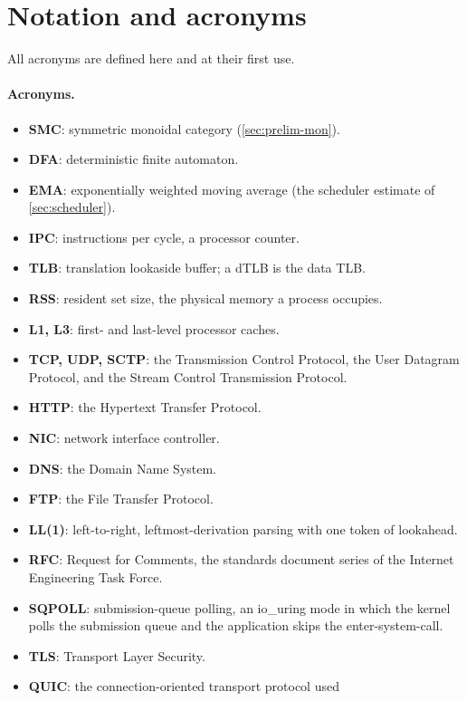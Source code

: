 \section{Notation and acronyms}\label{sec:prelim-notation}

All acronyms are defined here and at their first use.

\paragraph{Acronyms.}
\begin{itemize}
\item \textbf{SMC}: symmetric monoidal category (\autoref{sec:prelim-mon}).
\item \textbf{DFA}: deterministic finite automaton.
\item \textbf{EMA}: exponentially weighted moving average (the
  scheduler estimate of \autoref{sec:scheduler}).
\item \textbf{IPC}: instructions per cycle, a processor counter.
\item \textbf{TLB}: translation lookaside buffer; a dTLB is the data
  TLB.
\item \textbf{RSS}: resident set size, the physical memory a process
  occupies.
\item \textbf{L1, L3}: first- and last-level processor caches.
\item \textbf{TCP, UDP, SCTP}: the Transmission Control Protocol, the
  User Datagram Protocol, and the Stream Control Transmission Protocol.
\item \textbf{HTTP}: the Hypertext Transfer Protocol.
\item \textbf{NIC}: network interface controller.
\item \textbf{DNS}: the Domain Name System.
\item \textbf{FTP}: the File Transfer Protocol.
\item \textbf{LL(1)}: left-to-right, leftmost-derivation parsing with
  one token of lookahead.
\item \textbf{RFC}: Request for Comments, the standards document series
  of the Internet Engineering Task Force.
\item \textbf{SQPOLL}: submission-queue polling, an io\_uring mode in
  which the kernel polls the submission queue and the application skips
  the enter-system-call.
\item \textbf{TLS}: Transport Layer Security.
\item \textbf{QUIC}: the connection-oriented transport protocol used

\end{itemize}

